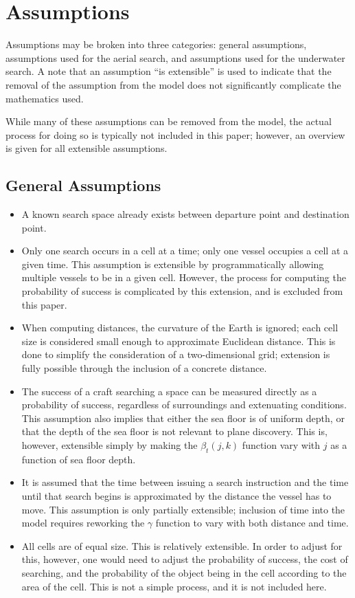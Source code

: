 \section{Assumptions}

Assumptions may be broken into three categories: general assumptions, assumptions used for the aerial search, and assumptions used for the underwater search. A note that an assumption ``is extensible'' is used to indicate that the removal of the assumption from the model does not significantly complicate the mathematics used.

While many of these assumptions can be removed from the model, the actual process for doing so is typically not included in this paper; however, an overview is given for all extensible assumptions.

\subsection{General Assumptions}

\begin{itemize}
\item A known search space already exists between departure point and destination point.
\item Only one search occurs in a cell at a time; only one vessel occupies a cell at a given time. This assumption is extensible by programmatically allowing multiple vessels to be in a given cell. However, the process for computing the probability of success is complicated by this extension, and is excluded from this paper.
\item When computing distances, the curvature of the Earth is ignored; each cell size is considered small enough to approximate Euclidean distance. This is done to simplify the consideration of a two-dimensional grid; extension is fully possible through the inclusion of a concrete distance.
\item The success of a craft searching a space can be measured directly as a probability of success, regardless of surroundings and extenuating conditions. This assumption also implies that either the sea floor is of uniform depth, or that the depth of the sea floor is not relevant to plane discovery. This is, however, extensible simply by making the $\beta_t(j,k)$ function vary with $j$ as a function of sea floor depth.
\item It is assumed that the time between issuing a search instruction and the time until that search begins is approximated by the distance the vessel has to move. This assumption is only partially extensible; inclusion of time into the model requires reworking the $\gamma$ function to vary with both distance and time.
\item All cells are of equal size. This is relatively extensible. In order to adjust for this, however, one would need to adjust the probability of success, the cost of searching, and the probability of the object being in the cell according to the area of the cell. This is not a simple process, and it is not included here.
\end{itemize}

